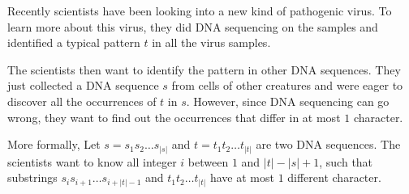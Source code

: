Recently scientists have been looking into a new kind of pathogenic virus.
To learn more about this virus, they did DNA sequencing on the samples and identified a typical pattern $t$ in all the virus samples.

The scientists then want to identify the pattern in other DNA sequences.
They just collected a DNA sequence $s$ from cells of other creatures and were eager to discover all the occurrences of $t$ in $s$.
However, since DNA sequencing can go wrong, they want to find out the occurrences that differ in at most $1$ character.

More formally, Let $s=s_1s_2\ldots s_{|s|}$ and $t = t_1t_2\ldots t_{|t|}$ are two DNA sequences.
The scientists want to know all integer $i$ between $1$ and $|t|-|s|+1$, such that substrings $s_is_{i+1}\ldots s_{i+|t|-1}$ and $t_1t_2\ldots t_{|t|}$ have at most $1$ different character.